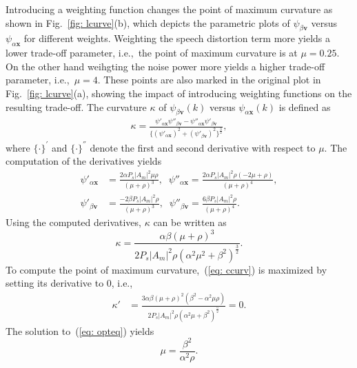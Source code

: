\documentclass[10pt]{IEEEtran}
\begin{document}
Introducing a weighting function changes the point of maximum curvature as shown in Fig.~\ref{fig: lcurve}(b), which depicts the parametric plots of $\psi_{\beta \mathbf{v}}$ versus $\psi_{\alpha \mathbf{x}}$ for different weights.
Weighting the speech distortion term more yields a lower trade-off parameter, i.e.,~the point of maximum curvature is at $\mu = 0.25$.
On the other hand weihgting the noise power more yields a higher trade-off parameter, i.e.,~$\mu = 4$.
These points are also marked in the original plot in Fig.~\ref{fig: lcurve}(a), showing the impact of introducing weighting functions on the resulting trade-off. \newline
The curvature $\kappa$ of $\psi_{\beta \mathbf{v}}(k)$ versus $\psi_{\alpha \mathbf{x}}(k)$ is defined as~\cite{Sternberg_book_2012}
\begin{align}
  \label{eq: curv}
  \kappa = \frac{ \psi'_{\alpha\mathbf{x}} \psi''_{\beta\mathbf{v}} - \psi''_{\alpha\mathbf{x}} \psi'_{\beta\mathbf{v}}}{\{(\psi'_{\alpha \mathbf{x}})^{2} + (\psi'_{\beta\mathbf{v}})^{2}\}^{\frac{3}{2}}},
\end{align}
where $\{ \cdot \}^{'}$ and $\{ \cdot \}^{''}$ denote the first and second derivative with respect to $\mu$.
The computation of the derivatives yields
\begin{align}
  \label{eq: psii}
  \psi'_{\alpha\mathbf{x}} &\!\! = \! \!\frac{2 \alpha P_s|A_m|^2 \mu \rho}{(\mu+\rho)^3}, \; \; \psi''_{\alpha\mathbf{x}} \!\! = \!\! \frac{2  \alpha P_s|A_m|^2\rho(-2\mu+\rho)}{(\mu+\rho)^4}, \\
  \psi'_{\beta\mathbf{v}} &\!\!= \!\! \frac{-2 \beta P_s|A_m|^2\rho}{(\mu+\rho)^3}, \; \; \psi''_{\beta\mathbf{v}}\!\!=\!\! \frac{6 \beta P_s|A_m|^2\rho}{(\mu+\rho)^4}.
\end{align}
Using the computed derivatives, $\kappa$ can be written as
\begin{equation}
  \label{eq: ccurv}
  \kappa = \frac{\alpha\beta (\mu + \rho)^3}{2 P_s |A_m|^2 \rho (\alpha^2 \mu^2 + \beta^2)^{\frac{3}{2}}}.
\end{equation}
To compute the point of maximum curvature,~(\ref{eq: ccurv}) is maximized by setting its derivative to $0$, i.e.,
\begin{align}
  \label{eq: opteq}
  \kappa' & = \frac{3\alpha\beta(\mu+\rho)^2 (\beta^2- \alpha^2\mu \rho)}{2 P_s|A_m|^2\rho (\alpha^2 \mu + \beta^2)^{\frac{5}{2}}} = 0.
\end{align}
The solution to~(\ref{eq: opteq}) yields
\begin{equation}
  \label{eq: optpar}
  \mu = \frac{\beta^2}{\alpha^2 \rho}.
\end{equation}
\end{document}
